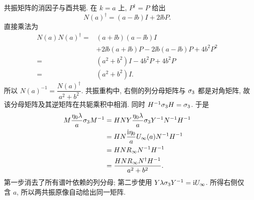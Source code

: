 \par\smallskip\noindent 共振矩阵的消因子与酉共轭.\quad
在 $k=a$ 上, $P^\dagger=P$ 给出
\begin{equation*}
N(a)^\dagger=(a-\ii b)I+2\ii bP.
\end{equation*}
直接乘法为
\begin{equation*}
\begin{aligned}
N(a)N(a)^\dagger
={}&(a+\ii b)(a-\ii b)I\\
&+2\ii b(a+\ii b)P
-2\ii b(a-\ii b)P
+4b^2P^2\\
={}&(a^2+b^2)I-4b^2P+4b^2P\\
={}&(a^2+b^2)I.
\end{aligned}
\end{equation*}
所以 $N(a)^{-1}=\dfrac{N(a)^\dagger}{a^2+b^2}$.
共振重构中, 右侧的列分母矩阵与 $\sigma_3$ 都是对角矩阵,
故该分母矩阵及其逆矩阵在共轭乘积中相消.
同时 $H^{-1}\sigma_3 H=\sigma_3$.
于是
\begin{equation*}
\begin{aligned}
M\dfrac{\eta_0\lambda}{a}\sigma_3 M^{-1}
&=HN Y\dfrac{\eta_0\lambda}{a}\sigma_3 Y^{-1}N^{-1}H^{-1}\\
&=HN\dfrac{\mathrm{i}\eta_0}{a}U_\infty(a)N^{-1}H^{-1}\\
&=HN R_\infty N^{-1}H^{-1}\\
&=\dfrac{HN R_\infty N^\dagger H^{-1}}{a^2+b^2}.
\end{aligned}
\end{equation*}
第一步消去了所有谱叶依赖的列分母;
第二步使用 $Y\lambda\sigma_3 Y^{-1}=\mathrm{i} U_\infty$.
所得右侧仅含 $a$, 所以两共振原像自动给出同一矩阵.


